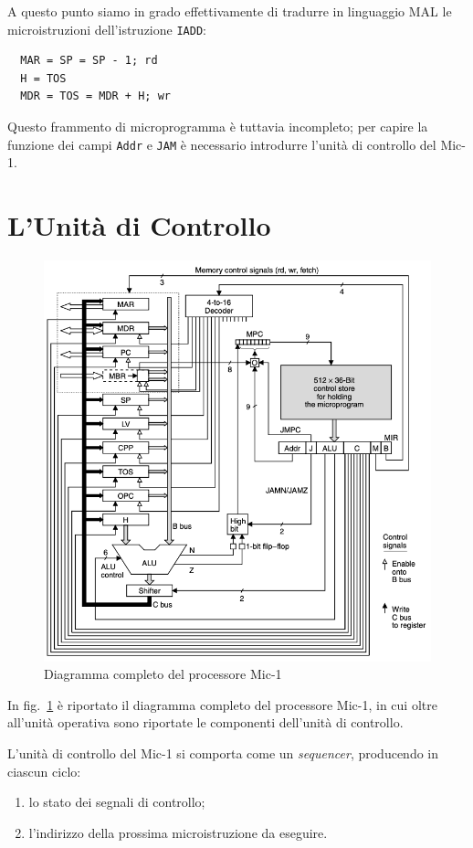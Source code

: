 \documentclass[a4paper,12pt]{scrreprt}
\begin{document}
A questo punto siamo in grado effettivamente di tradurre in linguaggio MAL le
microistruzioni dell'istruzione \lstinline{IADD}:

\begin{lstlisting}
  MAR = SP = SP - 1; rd
  H = TOS
  MDR = TOS = MDR + H; wr
\end{lstlisting}

Questo frammento di microprogramma è tuttavia incompleto; per capire la funzione
dei campi \lstinline{Addr} e \lstinline{JAM} è necessario introdurre l'unità di
controllo del Mic-1.

\section{L'Unità di Controllo}

\begin{figure}
  \centering
  \includegraphics[width=\textwidth]{mic1.png}
  \caption{Diagramma completo del processore Mic-1}\label{fig:mic1}
\end{figure}

In fig.~\ref{fig:mic1} è riportato il diagramma completo del processore Mic-1,
in cui oltre all'unità operativa sono riportate le componenti dell'unità di
controllo.

L'unità di controllo del Mic-1 si comporta come un \textit{sequencer},
producendo in ciascun ciclo:
\begin{enumerate}
  \item lo stato dei segnali di controllo;
  \item l'indirizzo della prossima microistruzione da eseguire.
\end{enumerate}
\end{document}
